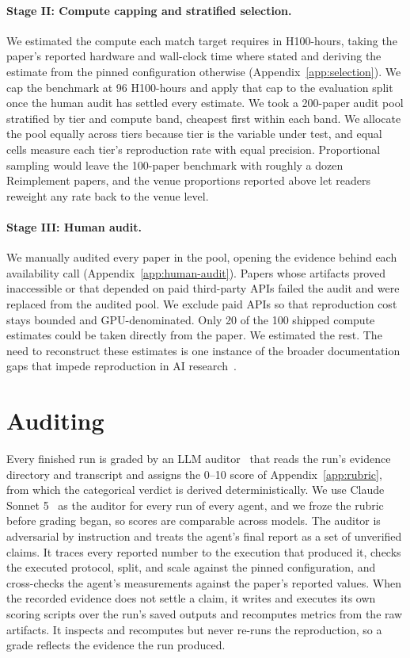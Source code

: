 \documentclass{article} %
\begin{document}
\paragraph{Stage II: Compute capping and stratified selection.} We estimated the
compute each match target requires in H100-hours, taking the paper's reported
hardware and wall-clock time where stated and deriving the estimate from the
pinned configuration otherwise (Appendix~\ref{app:selection}). We cap the
benchmark at 96 H100-hours and apply that cap to the evaluation split once the
human audit has settled every estimate. We took a 200-paper audit pool
stratified by tier and compute band, cheapest first within each band. We allocate the pool equally across
tiers because tier is the variable under test, and equal cells measure each
tier's reproduction rate with equal precision. Proportional sampling would leave the 100-paper benchmark with roughly a
dozen Reimplement papers, and the venue proportions reported above let readers reweight
any rate back to the venue level.

\paragraph{Stage III: Human audit.} We manually audited every paper in the
pool, opening the evidence behind each availability call
(Appendix~\ref{app:human-audit}). Papers whose artifacts proved
inaccessible or that depended on paid third-party APIs failed the audit and
were replaced from the audited pool. We
exclude paid APIs so that reproduction cost stays bounded and
GPU-denominated. Only 20 of
the 100 shipped compute estimates could be taken directly from the paper. We
estimated the rest. The need to reconstruct these
estimates is one instance of the broader documentation gaps that impede
reproduction in AI research~\citep{gundersen2018state,dodge2019show,henderson2020towards}.
\section{Auditing}
\label{sec:auditing}

Every finished run is graded by an LLM auditor~\citep{zheng2023judging,zhuge2025agent} that reads the
run's evidence directory and transcript and assigns the 0--10 score of
Appendix~\ref{app:rubric}, from which the categorical verdict is derived
deterministically. We use Claude Sonnet 5~\citep{anthropic2026sonnet5} as the
auditor for every run of
every agent, and we froze the rubric before grading began, so scores are
comparable across models. The auditor is
adversarial by instruction and treats the agent's final report as a set of
unverified claims. It traces every
reported number to the execution that produced it, checks the executed
protocol, split, and scale against the pinned configuration, and
cross-checks the agent's measurements against the paper's reported values.
When the recorded evidence does not settle a claim, it writes and executes
its own scoring scripts over the run's saved outputs and recomputes metrics from the raw artifacts. It inspects
and recomputes but never re-runs the reproduction, so a grade reflects the
evidence the run produced.
\end{document}
